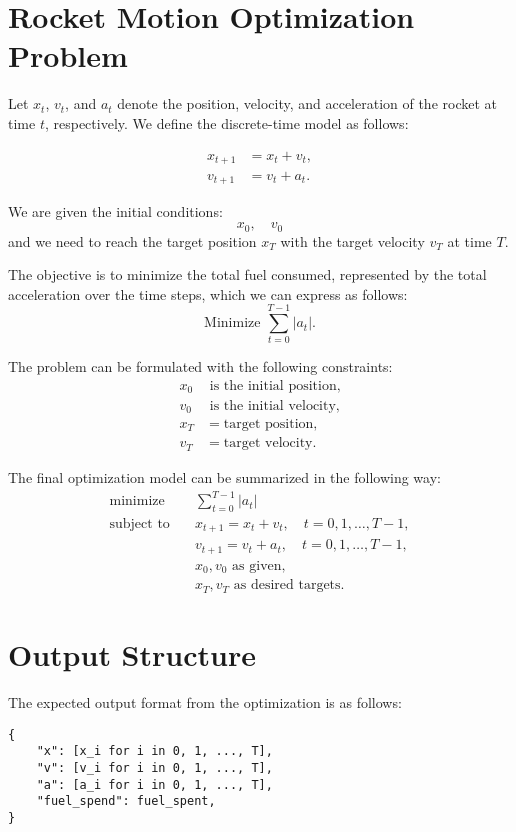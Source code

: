 \documentclass{article}
\begin{document}
\section*{Rocket Motion Optimization Problem}

Let \( x_t \), \( v_t \), and \( a_t \) denote the position, velocity, and acceleration of the rocket at time \( t \), respectively. We define the discrete-time model as follows:

\begin{align*}
x_{t+1} &= x_t + v_t, \\
v_{t+1} &= v_t + a_t.
\end{align*}

We are given the initial conditions:
\[
x_0, \quad v_0
\]
and we need to reach the target position \( x_T \) with the target velocity \( v_T \) at time \( T \).

The objective is to minimize the total fuel consumed, represented by the total acceleration over the time steps, which we can express as follows:
\[
\text{Minimize } \sum_{t=0}^{T-1} |a_t|.
\]

The problem can be formulated with the following constraints:
\begin{align*}
x_0 & \text{ is the initial position,} \\
v_0 & \text{ is the initial velocity,} \\
x_T &= \text{target position}, \\
v_T &= \text{target velocity}.
\end{align*}

The final optimization model can be summarized in the following way:
\[
\begin{aligned}
\text{minimize} \quad & \sum_{t=0}^{T-1} |a_t| \\
\text{subject to} \quad & x_{t+1} = x_t + v_t, \quad t = 0, 1, \ldots, T - 1,\\
& v_{t+1} = v_t + a_t, \quad t = 0, 1, \ldots, T - 1,\\
& x_0, v_0 \text{ as given,} \\
& x_T, v_T \text{ as desired targets.}
\end{aligned}
\]

\section*{Output Structure}

The expected output format from the optimization is as follows:

\begin{verbatim}
{
    "x": [x_i for i in 0, 1, ..., T],
    "v": [v_i for i in 0, 1, ..., T],
    "a": [a_i for i in 0, 1, ..., T],
    "fuel_spend": fuel_spent,
}
\end{verbatim}
\end{document}
